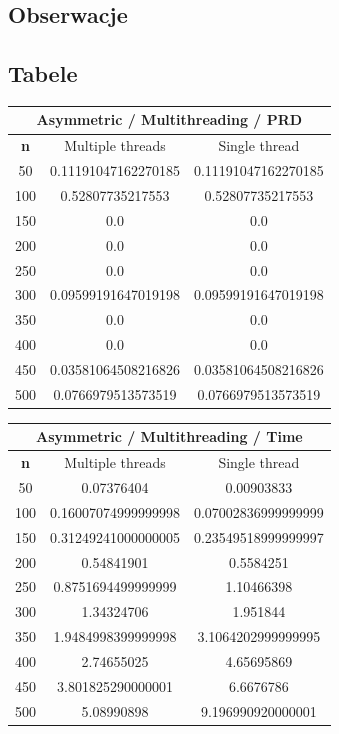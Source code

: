\documentclass{article}
\begin{document}
\subsection{Obserwacje}

\subsection{Tabele}

\begin{center}
\begin{tabular}{|c|c|c|}
\hline
\multicolumn{3}{|c|}{\textbf{Asymmetric / Multithreading / PRD}}\\
\hline
\textbf{n} & Multiple threads & Single thread\\
\hline
50 & 0.11191047162270185 & 0.11191047162270185\\
\hline
100 & 0.52807735217553 & 0.52807735217553\\
\hline
150 & 0.0 & 0.0\\
\hline
200 & 0.0 & 0.0\\
\hline
250 & 0.0 & 0.0\\
\hline
300 & 0.09599191647019198 & 0.09599191647019198\\
\hline
350 & 0.0 & 0.0\\
\hline
400 & 0.0 & 0.0\\
\hline
450 & 0.03581064508216826 & 0.03581064508216826\\
\hline
500 & 0.0766979513573519 & 0.0766979513573519\\
\hline
\end{tabular}
\end{center}


\begin{center}
\begin{tabular}{|c|c|c|}
\hline
\multicolumn{3}{|c|}{\textbf{Asymmetric / Multithreading / Time}}\\
\hline
\textbf{n} & Multiple threads & Single thread\\
\hline
50 & 0.07376404 & 0.00903833\\
\hline
100 & 0.16007074999999998 & 0.07002836999999999\\
\hline
150 & 0.31249241000000005 & 0.23549518999999997\\
\hline
200 & 0.54841901 & 0.5584251\\
\hline
250 & 0.8751694499999999 & 1.10466398\\
\hline
300 & 1.34324706 & 1.951844\\
\hline
350 & 1.9484998399999998 & 3.1064202999999995\\
\hline
400 & 2.74655025 & 4.65695869\\
\hline
450 & 3.801825290000001 & 6.6676786\\
\hline
500 & 5.08990898 & 9.196990920000001\\
\hline
\end{tabular}
\end{center}
\end{document}
